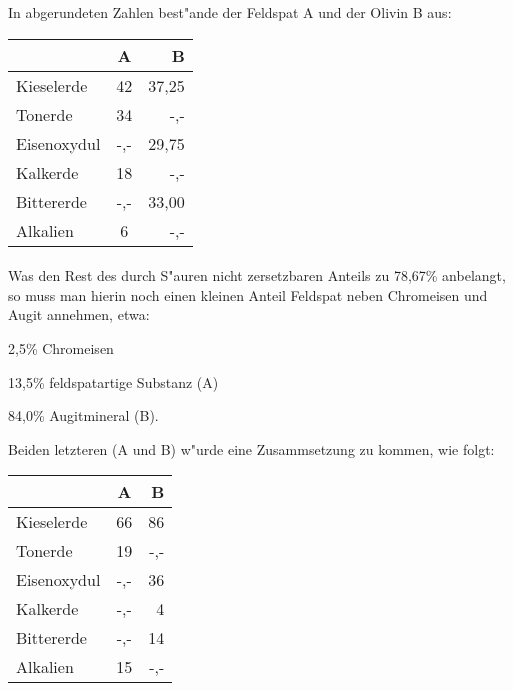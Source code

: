 \documentclass[a4paper, 11pt, oneside]{article}
\begin{document}
In abgerundeten Zahlen best"ande der Feldspat A und der Olivin B aus:
\begin{center}
    \begin{tabular}{ |l|c|r| } 
    \hline
    & A & B\\
    \hline\hline
    Kieselerde & 42 & 37,25\\\hline
    Tonerde & 34 & -,-\\\hline
    Eisenoxydul & -,- & 29,75\\\hline
    Kalkerde & 18 & -,-\\\hline
    Bittererde & -,- & 33,00\\\hline
    Alkalien & 6 & -,-\\
    \hline
    \end{tabular}
\end{center}
\paragraph{}
Was den Rest des durch S"auren nicht zersetzbaren Anteils zu 78,67\% anbelangt, so muss man hierin noch einen kleinen Anteil Feldspat neben Chromeisen und Augit annehmen, etwa:

2,5\% Chromeisen

13,5\% feldspatartige Substanz (A)

84,0\% Augitmineral (B).

Beiden letzteren (A und B) w"urde eine Zusammsetzung zu kommen, wie folgt:
\begin{center}
    \begin{tabular}{ |l|c|r| } 
    \hline
    & A & B\\
    \hline\hline
    Kieselerde & 66 & 86\\\hline
    Tonerde & 19 & -,-\\\hline
    Eisenoxydul & -,- & 36\\\hline
    Kalkerde & -,- & 4\\\hline
    Bittererde & -,- & 14\\\hline
    Alkalien & 15 & -,-\\
    \hline
    \end{tabular}
\end{center}
\end{document}
